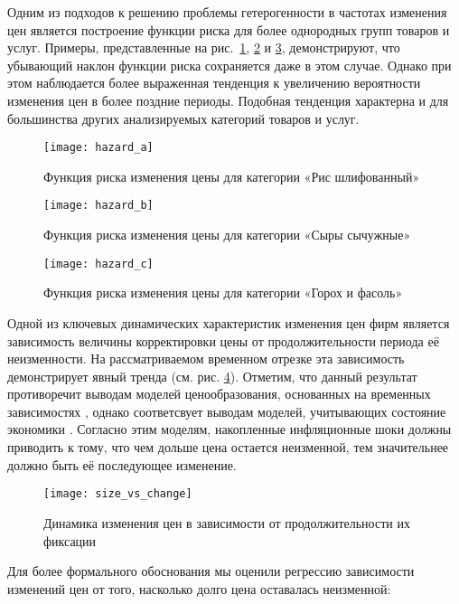 Одним из подходов к решению проблемы гетерогенности в частотах изменения цен является построение функции риска для более однородных групп товаров и услуг. Примеры, представленные на рис.~\ref{fig:hazard_a}, \ref{fig:hazard_b} и \ref{fig:hazard_c}, демонстрируют, что убывающий наклон функции риска сохраняется даже в этом случае. Однако при этом наблюдается более выраженная тенденция к увеличению вероятности изменения цен в более поздние периоды. Подобная тенденция характерна и для большинства других анализируемых категорий товаров и услуг.

\begin{figure}[h]
	\centering
	\texttt{[image: hazard\_a]}
	\caption{Функция риска изменения цены для категории «Рис шлифованный»}
	\label{fig:hazard_a}
\end{figure}

\begin{figure}[h]
	\centering
	\texttt{[image: hazard\_b]}
	\caption{Функция риска изменения цены для категории «Сыры сычужные»}
	\label{fig:hazard_b}
\end{figure}

\begin{figure}[h]
	\centering
	\texttt{[image: hazard\_c]}
	\caption{Функция риска изменения цены для категории «Горох и фасоль»}
	\label{fig:hazard_c}
\end{figure}

Одной из ключевых динамических характеристик изменения цен фирм является зависимость величины корректировки цены от продолжительности периода её неизменности. На рассматриваемом временном отрезке эта зависимость демонстрирует явный тренда (см. рис. \ref{fig:size_vs_change}). Отметим, что данный результат противоречит выводам моделей ценообразования, основанных на временных зависимостях \cite{Taylor1980, Calvo1983}, однако соответсвует выводам моделей, учитывающих состояние экономики \cite{Dotsey1999, golosov2007}. Согласно этим моделям, накопленные инфляционные шоки должны приводить к тому, что чем дольше цена остается неизменной, тем значительнее должно быть её последующее изменение.

\begin{figure}[h]
	\centering
	\texttt{[image: size\_vs\_change]}
	\caption{Динамика изменения цен в зависимости от продолжительности их фиксации}
	\label{fig:size_vs_change}
\end{figure}

Для более формального обоснования мы оценили регрессию зависимости изменений цен от того, насколько долго цена оставалась неизменной:

